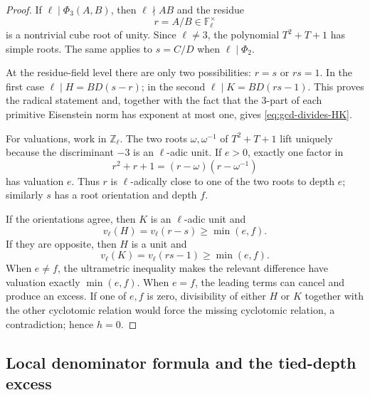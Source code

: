 \documentclass[11pt]{article}
\theoremstyle{definition}
\theoremstyle{remark}
\newcommand{\Z}{\mathbb{Z}}
\begin{document}
\begin{proof}
If $\ell\mid\Phi_3(A,B)$, then $\ell\nmid AB$ and the residue
\[
 r=A/B\in\mathbb F_\ell^\times
\]
is a nontrivial cube root of unity.  Since $\ell\ne3$, the polynomial $T^2+T+1$ has simple roots.  The same applies to $s=C/D$ when $\ell\mid\Phi_2$.

At the residue-field level there are only two possibilities: $r=s$ or $rs=1$.  In the first case $\ell\mid H=BD(s-r)$; in the second $\ell\mid K=BD(rs-1)$.  This proves the radical statement and, together with the fact that the $3$-part of each primitive Eisenstein norm has exponent at most one, gives \eqref{eq:gcd-divides-HK}.

For valuations, work in $\Z_\ell$.  The two roots $\omega,\omega^{-1}$ of $T^2+T+1$ lift uniquely because the discriminant $-3$ is an $\ell$-adic unit.  If $e>0$, exactly one factor in
\[
 r^2+r+1=(r-\omega)(r-\omega^{-1})
\]
has valuation $e$.  Thus $r$ is $\ell$-adically close to one of the two roots to depth $e$; similarly $s$ has a root orientation and depth $f$.

If the orientations agree, then $K$ is an $\ell$-adic unit and
\[
 v_\ell(H)=v_\ell(r-s)\ge\min(e,f).
\]
If they are opposite, then $H$ is a unit and
\[
 v_\ell(K)=v_\ell(rs-1)\ge\min(e,f).
\]
When $e\ne f$, the ultrametric inequality makes the relevant difference have valuation exactly $\min(e,f)$.  When $e=f$, the leading terms can cancel and produce an excess.  If one of $e,f$ is zero, divisibility of either $H$ or $K$ together with the other cyclotomic relation would force the missing cyclotomic relation, a contradiction; hence $h=0$.
\end{proof}

\subsection{Local denominator formula and the tied-depth excess}
\end{document}
